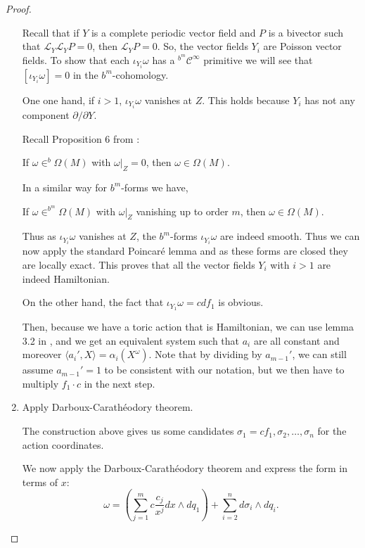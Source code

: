 \begin{proof}
\begin{enumerate}
Recall that if $Y$ is a complete periodic vector field and $P$ is a bivector such that $\mathcal{L}_Y\mathcal{L}_Y P = 0$, then $\mathcal{L}_Y P = 0$.
So, the vector fields $Y_i$ are Poisson vector fields.
To show that each $\iota_{Y_i}\omega$ has a $^{b^m}\mathcal{C}^\infty$ primitive we will see that $[\iota_{Y_i}\omega] = 0$ in the $b^m$-cohomology.

One one hand, if $i >1$, $\iota_{Y_i}\omega$ vanishes at $Z$. This holds because $Y_i$ has not any component $\partial/\partial Y$.

Recall Proposition 6 from \cite{GMP14}:


\begin{proposition} If $\omega \in ^b \Omega(M)$ with $ \omega|_Z=0$, then $\omega\in \Omega(M)$.
\end{proposition}
In  a similar way for $b^m$-forms we have,


\begin{proposition} If $\omega \in ^{b^m} \Omega(M)$ with $\omega|_Z$ vanishing up to order $m$, then $\omega \in \Omega(M)$.
\end{proposition}


Thus as $\iota_{Y_i}\omega$ vanishes at $Z$, the $b^m$-forms  $\iota_{Y_i}\omega$ are indeed  smooth.
Thus  we can now apply the standard Poincaré lemma and as these forms are closed they are locally exact. This proves that all the vector fields $Y_i$ with $i>1$ are indeed Hamiltonian.

On the other hand, the fact that $\iota_{Y_1} \omega = c df_1$ is obvious.



Then, because we have a toric action that is Hamiltonian, we can use lemma 3.2 in \cite{GMP17}, and  we get an equivalent system such that $a_i$ are all constant and moreover $\langle a_i', X\rangle = \alpha_i(X^\omega)$. Note that by dividing by $a_{m-1}'$, we can still assume $a_{m-1}'=1$ to be consistent with our notation, but  we then have to multiply $f_1\cdot c$ in the next step.


\item Apply Darboux-Carathéodory theorem.

The construction above gives us some candidates $\sigma_1 = c f_1,\sigma_2,\ldots,\sigma_n$ for the action coordinates.

We now apply the Darboux-Carathéodory theorem and express the form in terms of $x$:
$$\omega = \left(\sum_{j= 1}^{m} c \frac{c_j}{x^j} dx\wedge d q_1\right)+ \sum_{i=2}^{n}d\sigma_i\wedge dq_i.$$


\end{enumerate}
\end{proof}

